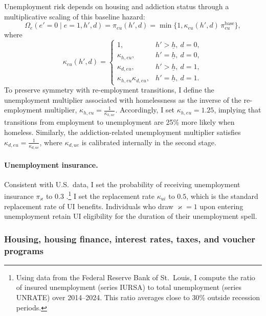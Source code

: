 \documentclass[parskip=full]{article}
\theoremstyle{plain}
\theoremstyle{definition}
\theoremstyle{remark}
\begin{document}
Unemployment risk depends on housing and addiction status through a multiplicative scaling of this baseline hazard:
\begin{equation*}
\Omega_e(e'=0 \mid e=1, h', d)=\pi_{eu}(h',d)=
\min\{1,\kappa_{eu}(h',d)\,\pi_{eu}^{\text{base}}\},
\label{eq:jobloss}
\end{equation*}
where
\begin{equation*}
\kappa_{eu}(h',d)=
\begin{cases}
1, & h'>\underline h,\ d=0,\\
\kappa_{h,eu}, & h'=\underline h,\ d=0,\\
\kappa_{d,eu}, & h'>\underline h,\ d=1,\\
\kappa_{h,eu}\kappa_{d,eu}, & h'=\underline h,\ d=1.
\end{cases}
\label{eq:kappa_eu}
\end{equation*}
To preserve symmetry with re-employment transitions, I define the unemployment multiplier associated with homelessness as the inverse of the re-employment multiplier, $\kappa_{h,eu}=\frac{1}{\kappa_{h,ue}}$. Accordingly, I set $\kappa_{h,eu}=1.25$, implying that transitions from employment to unemployment are 25\% more likely when homeless. Similarly, the addiction-related unemployment multiplier satisfies $\kappa_{d,eu}=\frac{1}{\kappa_{d,ue}}$, where $\kappa_{d,ue}$ is calibrated internally in the second stage.

\paragraph{Unemployment insurance.}
Consistent with U.S.\ data, I set the probability of receiving unemployment insurance $\pi_\varkappa$ to $0.3$ \citep{fred-ui}.\footnote{Using data from the Federal Reserve Bank of St.\ Louis, I compute the ratio of insured unemployment (series IURSA) to total unemployment (series UNRATE) over 2014--2024. This ratio averages close to 30\% outside recession periods.} I set the replacement rate $\kappa_{ui}$ to $0.5$, which is the standard replacement rate of UI benefits. Individuals who draw $\varkappa=1$ upon entering unemployment retain UI eligibility for the duration
of their unemployment spell.

\subsubsection{Housing, housing finance, interest rates, taxes, and voucher programs}
\end{document}
